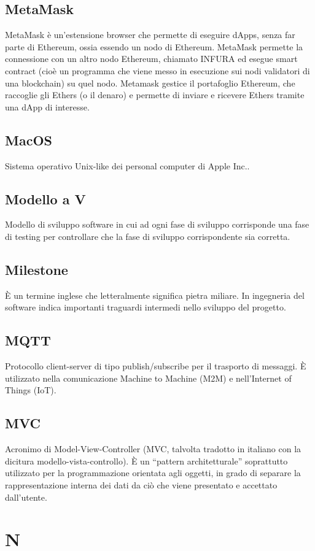 \subsection{MetaMask} MetaMask è un'estensione browser che permette di eseguire dApps, senza far parte di Ethereum, ossia essendo un nodo di Ethereum. MetaMask permette la connessione con un altro nodo Ethereum, chiamato INFURA ed esegue smart contract (cioè un programma che viene messo in esecuzione sui nodi validatori di una blockchain) su quel nodo. Metamask gestice il portafoglio Ethereum, che raccoglie gli Ethers (o il denaro) e permette di inviare e ricevere Ethers tramite una dApp di interesse.
\subsection{MacOS} Sistema operativo Unix-like dei personal computer di Apple Inc..
\subsection{Modello a V} Modello di sviluppo software in cui ad ogni fase di sviluppo corrisponde una fase di testing per controllare che la fase di sviluppo corrispondente sia corretta.
\subsection{Milestone} È un termine inglese che letteralmente significa pietra miliare. In ingegneria del software indica importanti traguardi intermedi nello sviluppo del progetto.
\subsection{MQTT} Protocollo client-server di tipo publish/subscribe per il trasporto di messaggi. È utilizzato nella comunicazione Machine to Machine (M2M) e nell'Internet of Things (IoT).
\subsection{MVC} Acronimo di Model-View-Controller (MVC, talvolta tradotto in italiano con la dicitura modello-vista-controllo). È un “pattern architetturale”  soprattutto utilizzato per la programmazione orientata agli oggetti, in grado di separare la rappresentazione interna dei dati da ciò che viene presentato e accettato dall'utente.
\newpage \section{N}

